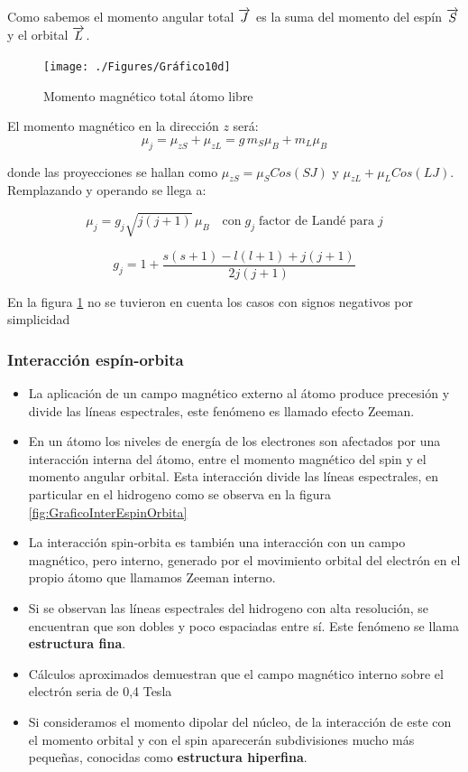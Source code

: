Como sabemos el momento angular total $\overrightarrow{J}$ es la suma del momento del espín $\overrightarrow{S}$ y el orbital $\overrightarrow{L}$.

\begin{figure}[H]
    \centering
    \texttt{[image: ./Figures/Gráfico10d]}
	\caption{Momento magnético total átomo libre}
	\label{fig:Grafico10d}
\end{figure}


El momento magnético en la dirección $z$ será:
\begin{equation}
	\mu_{j} = \mu_{zS}+\mu_{zL} = g\,m_{S}\mu_{B}+m_{L}\mu_{B}
\end{equation}

donde las proyecciones se hallan como $\mu_{zS}=\mu_{S}Cos(SJ)$ y $\mu_{zL}+\mu_{L}Cos(LJ)$. Remplazando y operando se llega a:

\begin{equation}
	\mu_{j} = g_{j}\sqrt{j(j+1)}\,\mu_{B} \quad \text{con} \; g_{j}\;  \text{factor de Landé para}\; j    
\end{equation}

\begin{equation}
	g_{j} = 1 + \frac{s(s+1)-l(l+1)+j(j+1)}{2j(j+1)}
\end{equation}

En la figura \ref{fig:Grafico10d} no se tuvieron en cuenta los casos con signos negativos por simplicidad

\subsubsection{Interacción espín-orbita}

\begin{itemize}
	\item La aplicación de un campo magnético externo al átomo produce precesión y divide las líneas espectrales, este fenómeno es llamado efecto Zeeman.
	\item En un átomo los niveles de energía de los electrones son afectados por una interacción interna del átomo, entre el momento magnético del spin y el momento angular orbital. Esta interacción divide las líneas espectrales, en particular en el hidrogeno como se observa en la figura \ref{fig:GraficoInterEspinOrbita}
	\item La interacción spin-orbita es también una interacción con un campo magnético, pero interno, generado por el movimiento orbital del electrón en el propio átomo que llamamos Zeeman interno.
	\item Si se observan las líneas espectrales del hidrogeno con alta resolución, se encuentran que son dobles y poco espaciadas entre sí. Este fenómeno se llama \textbf{estructura fina}.
	\item Cálculos aproximados demuestran que el campo magnético interno sobre el electrón seria de 0,4 Tesla
	\item Si consideramos el momento dipolar del núcleo, de la interacción de este con el momento orbital y con el spin aparecerán subdivisiones mucho más pequeñas, conocidas como \textbf{estructura hiperfina}.
	
\end{itemize}

